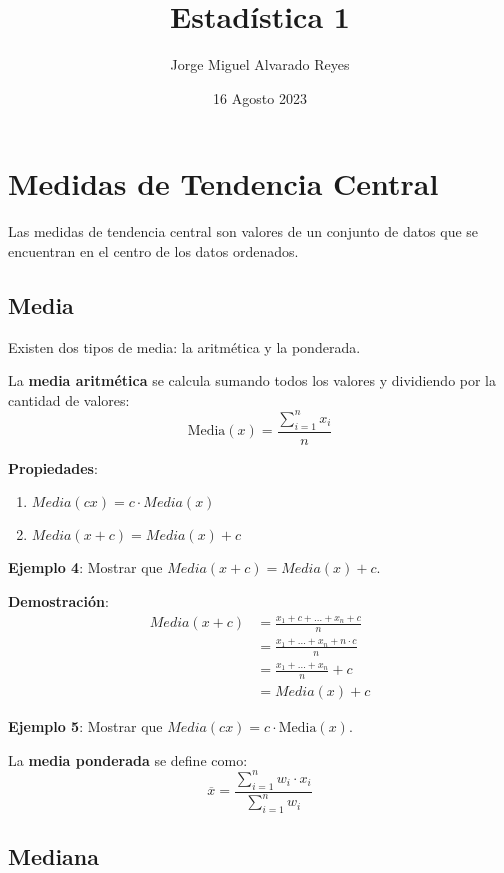 \documentclass[11pt, a4paper]{report}
\title{Estadística 1}
\author{Jorge Miguel Alvarado Reyes}
\date{16 Agosto 2023}
\begin{document}
\maketitle

\tableofcontents

\newpage

\section{Medidas de Tendencia Central}

Las medidas de tendencia central son valores de un conjunto de datos que se encuentran en el centro de los datos ordenados.

\subsection{Media}

Existen dos tipos de media: la aritmética y la ponderada.

La \textbf{media aritmética} se calcula sumando todos los valores y dividiendo por la cantidad de valores:
\[
    \text{Media}(x) = \frac{\sum_{i=1}^{n} x_i}{n}
\]

\textbf{Propiedades}:
\begin{enumerate}
    \item $Media(cx) = c \cdot Media(x)$
    \item $Media(x+c) = Media(x) + c$
\end{enumerate}

\textbf{Ejemplo 4}:
Mostrar que $Media(x+c) = Media(x) + c$.

\textbf{Demostración}:
\[
    \begin{aligned}
        Media(x+c) & = \frac{x_1+c + \ldots + x_n+c}{n}         \\
                   & = \frac{x_1 + \ldots + x_n + n \cdot c}{n} \\
                   & = \frac{x_1 + \ldots + x_n}{n} + c         \\
                   & = Media(x) + c
    \end{aligned}
\]

\textbf{Ejemplo 5}:
Mostrar que $Media(cx) = c \cdot \text{Media}(x)$.

La \textbf{media ponderada} se define como:
\[
    \overline{x} = \frac{\sum_{i=1}^{n} w_i \cdot x_i}{\sum_{i=1}^{n} w_i}
\]

\subsection{Mediana}
\end{document}

